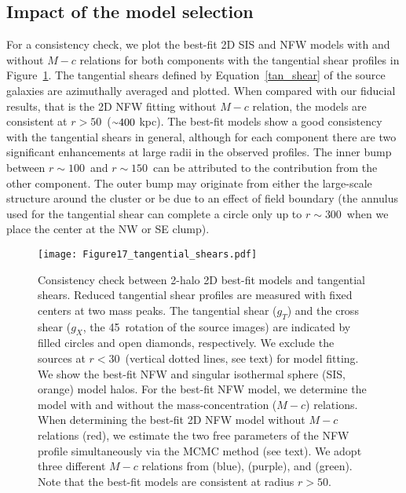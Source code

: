 \documentclass[twocolumn]{aastex631}
\newcommand{\mytilde}{\raise.19ex\hbox{$\scriptstyle\sim$}}
\begin{document}
\subsection{Impact of the model selection} \label{check_2Dmodels}
For a consistency check, we plot the best-fit 2D SIS and NFW models with and without $M-c$ relations for both components with the tangential shear profiles in Figure~\ref{fig:shear_profiles}. 
The tangential shears defined by Equation~\ref{tan_shear} of the source galaxies are azimuthally averaged and plotted. 
When compared with our fiducial results, that is the 2D NFW fitting without $M-c$ relation, the models are consistent at $r > 50$\arcsec~($\mytilde400$ kpc). 
The best-fit models show a good consistency with the tangential shears in general, although for each component there are two significant enhancements at large radii in the observed profiles. 
The inner bump between $r\sim100$\arcsec~and $r\sim150$\arcsec~can be attributed to the contribution from the other component. 
The outer bump may originate from either the large-scale structure around the cluster or be due to an effect of field boundary (the annulus used for the tangential shear can complete a circle only up to $r\sim300$\arcsec~when we place the center at the NW or SE clump).



\begin{figure}
\centering
\texttt{[image: Figure17\_tangential\_shears.pdf]}
\caption{Consistency check between 2-halo 2D best-fit models and tangential shears. 
Reduced tangential shear profiles are measured with fixed centers at two mass peaks. 
The tangential shear ($g_{T}$) and the cross shear ($g_{X}$, the 45\degr~rotation of the source images) are indicated by filled circles and open diamonds, respectively. 
We exclude the sources at $r < 30$\arcsec~(vertical dotted lines, see text) for model fitting. 
We show the best-fit NFW and singular isothermal sphere (SIS, orange) model halos. 
For the best-fit NFW model, we determine the model with and without the mass-concentration ($M-c$) relations. 
When determining the best-fit 2D NFW model without $M-c$ relations (red), we estimate the two free parameters of the NFW profile simultaneously via the MCMC method (see text). 
We adopt three different $M-c$ relations from \cite{Duffy08} (blue), \cite{DM14} (purple), and \cite{DJ19} (green). Note that the best-fit models are consistent at radius $r > 50$\arcsec. }
\label{fig:shear_profiles}
\end{figure}
\end{document}
